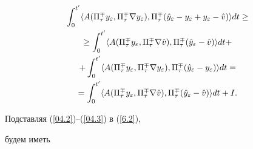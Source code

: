\begin{gather}


\int^{t'}_{0}


\langle A(  \Pi^{\mp}_{\tau}y_\varepsilon, \Pi^{\mp}_{\tau}


\nabla {y}_\varepsilon), \Pi^{\mp}_{\tau} (


 \Hat{y}_\varepsilon - y_\varepsilon


+ y_\varepsilon - \Hat{v} ) \rangle dt \ge\notag\\


%


\ge


\int^{t'}_{0}


\langle A(  \Pi^{\mp}_{\tau} {y}_\varepsilon, \Pi^{\mp}_{\tau}


\nabla \Hat{v} ), \Pi^{\mp}_{\tau} (\Hat{y}_\varepsilon


- \Hat{v} ) \rangle dt +\notag\\


%


+ \int^{t'}_{0}


\langle A(  \Pi^{\mp}_{\tau}y_\varepsilon, \Pi^{\mp}_{\tau}


\nabla y_\varepsilon),


\Pi^{\mp}_{\tau} (\Hat{y}_\varepsilon


- y_\varepsilon ) \rangle dt =\notag\\


=


\int^{t'}_{0}


\langle A(  \Pi^{\mp}_{\tau} {y}_\varepsilon, \Pi^{\mp}_{\tau}


\nabla \Hat{v} ), \Pi^{\mp}_{\tau} (\Hat{y}_\varepsilon


- \Hat{v} ) \rangle dt + I.


\label{04.3}


\end{gather}


Подставляя (\ref{04.2})--(\ref{04.3}) в (\ref{6.2}),


будем иметь


